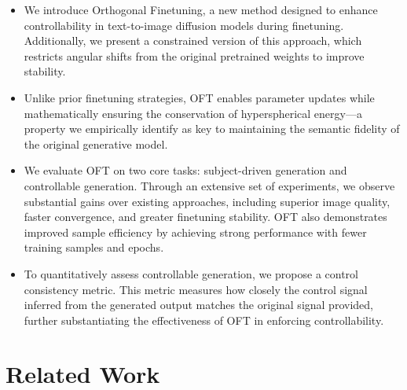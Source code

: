 \begin{itemize}[leftmargin=*,nosep]

    \item We introduce Orthogonal Finetuning, a new method designed to enhance controllability in text-to-image diffusion models during finetuning. Additionally, we present a constrained version of this approach, which restricts angular shifts from the original pretrained weights to improve stability.
    \item Unlike prior finetuning strategies, OFT enables parameter updates while mathematically ensuring the conservation of hyperspherical energy—a property we empirically identify as key to maintaining the semantic fidelity of the original generative model.
    \item We evaluate OFT on two core tasks: subject-driven generation and controllable generation. Through an extensive set of experiments, we observe substantial gains over existing approaches, including superior image quality, faster convergence, and greater finetuning stability. OFT also demonstrates improved sample efficiency by achieving strong performance with fewer training samples and epochs.
    \item To quantitatively assess controllable generation, we propose a control consistency metric. This metric measures how closely the control signal inferred from the generated output matches the original signal provided, further substantiating the effectiveness of OFT in enforcing controllability.
\end{itemize}

\section{Related Work}

